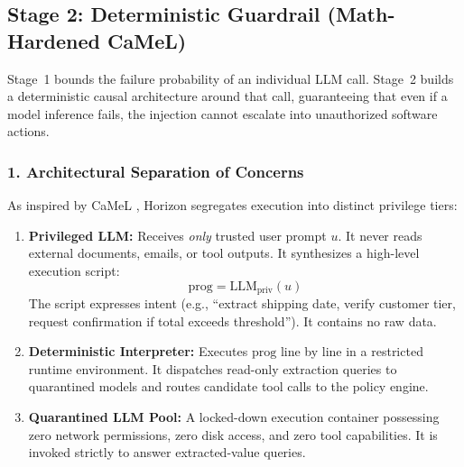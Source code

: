 \subsection{Stage 2: Deterministic Guardrail (Math-Hardened CaMeL)}
\label{subsec:horizon_stage2}

Stage~1 bounds the failure probability of an individual LLM call. Stage~2 builds a deterministic causal architecture around that call, guaranteeing that even if a model inference fails, the injection cannot escalate into unauthorized software actions.

\subsubsection{1. Architectural Separation of Concerns}
As inspired by CaMeL \cite{debenedetti2025camel}, Horizon segregates execution into distinct privilege tiers:
\begin{enumerate}
    \item \textbf{Privileged LLM:} Receives \emph{only} trusted user prompt $u$. It never reads external documents, emails, or tool outputs. It synthesizes a high-level execution script:
    \begin{equation}
        \mathrm{prog} = \mathrm{LLM}_{\mathrm{priv}}(u)
    \end{equation}
    The script expresses intent (e.g., ``extract shipping date, verify customer tier, request confirmation if total exceeds threshold''). It contains no raw data.
    \item \textbf{Deterministic Interpreter:} Executes $\mathrm{prog}$ line by line in a restricted runtime environment. It dispatches read-only extraction queries to quarantined models and routes candidate tool calls to the policy engine.
    \item \textbf{Quarantined LLM Pool:} A locked-down execution container possessing zero network permissions, zero disk access, and zero tool capabilities. It is invoked strictly to answer extracted-value queries.
\end{enumerate}

